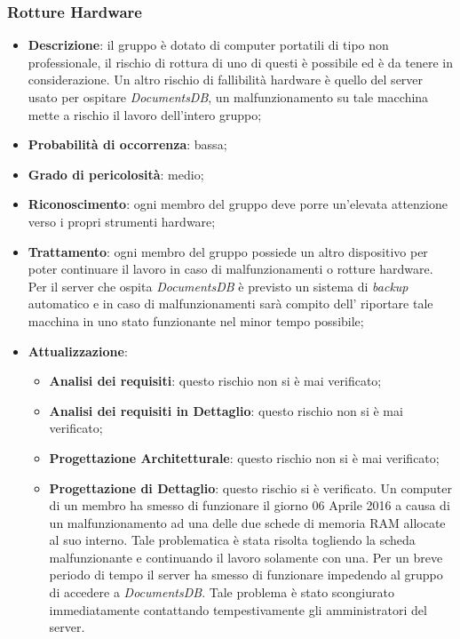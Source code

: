 		\subsubsection{Rotture Hardware}
		\begin{itemize}
			\item \textbf{Descrizione}: il gruppo è dotato di computer portatili di tipo non professionale, il rischio di rottura di uno di questi è possibile ed è da tenere in considerazione. Un altro rischio di fallibilità hardware è quello del server usato per ospitare \textit{DocumentsDB}, un malfunzionamento su tale macchina mette a rischio il lavoro dell'intero gruppo;
			\item \textbf{Probabilità di occorrenza}: bassa;
			\item \textbf{Grado di pericolosità}: medio;
			\item \textbf{Riconoscimento}: ogni membro del gruppo deve porre un'elevata attenzione verso i propri strumenti hardware;	
			\item \textbf{Trattamento}: ogni membro del gruppo possiede un altro dispositivo per poter continuare il lavoro in caso di malfunzionamenti o rotture hardware. Per il server che ospita \textit{DocumentsDB} è previsto un sistema di \textit{backup} automatico e in caso di malfunzionamenti sarà compito dell'\textit{\Amm} riportare tale macchina in uno stato funzionante nel minor tempo possibile;
			\item \textbf{Attualizzazione}:
			\begin{itemize}
				\item \textbf{Analisi dei requisiti}: questo rischio non si è mai verificato;
				\item \textbf{Analisi dei requisiti in Dettaglio}: questo rischio non si è mai verificato;
				\item \textbf{Progettazione Architetturale}: questo rischio non si è mai verificato;
				\item \textbf{Progettazione di Dettaglio}: questo rischio si è verificato. Un computer di un membro ha smesso di funzionare il giorno 06 Aprile 2016 a causa di un malfunzionamento ad una delle due schede di memoria RAM allocate al suo interno. Tale problematica è stata risolta togliendo la scheda malfunzionante e continuando il lavoro solamente con una. Per un breve periodo di tempo il server ha smesso di funzionare impedendo al gruppo di accedere a \textit{DocumentsDB}. Tale problema è stato scongiurato immediatamente contattando tempestivamente gli amministratori del server. 

\end{itemize}
\end{itemize}
